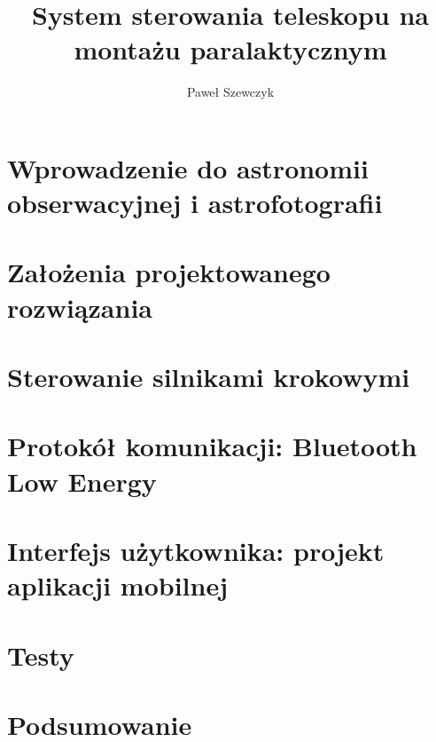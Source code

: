 \documentclass[a4paper,11pt,twoside,openany]{book}
\title{System sterowania teleskopu na montażu paralaktycznym}
\author{Paweł Szewczyk}
\date{}
\begin{document}
\maketitle

\tableofcontents

\chapter{Wprowadzenie do astronomii obserwacyjnej i astrofotografii}


\chapter{Założenia projektowanego rozwiązania}


\chapter{Sterowanie silnikami krokowymi}


\chapter{Protokół komunikacji: Bluetooth Low Energy}


\chapter{Interfejs użytkownika: projekt aplikacji mobilnej}

\chapter{Testy}

\chapter{Podsumowanie}


\end{document}
